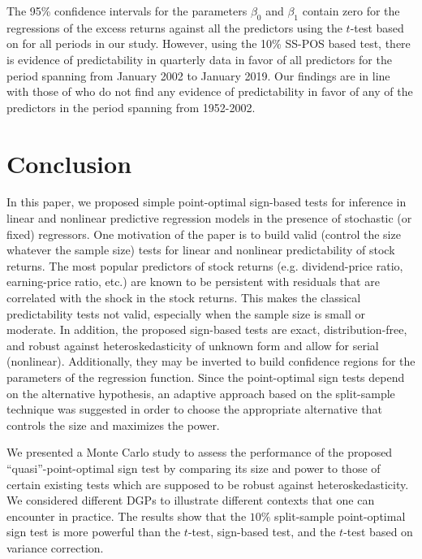 \documentclass[harvard,11pt]{article}
\begin{document}
The 95\% confidence intervals for the parameters $\beta_0$ and $\beta_1$ contain zero for the regressions of the excess returns against all the predictors using the $t$-test based on \citet{white1980heteroskedasticity} for all periods in our study. However, using the 10\% SS-POS based test, there is evidence of predictability in quarterly data in favor of all predictors for the period spanning from January 2002 to January 2019. Our findings are in line with those of \citet{campbell2006efficient} who do not find any evidence of predictability in favor of any of the predictors in the period spanning from 1952-2002. 



\section{Conclusion \label{ConclusionC1}}

In this paper, we proposed simple point-optimal sign-based tests for inference in linear
and nonlinear predictive regression models in the presence of stochastic (or fixed) regressors.
One motivation of the paper is to build valid (control the size whatever the
sample size) tests for linear and nonlinear predictability of stock returns.
The most popular predictors of stock returns (e.g. dividend-price ratio,
earning-price ratio, etc.) are known to be persistent with residuals that are correlated with
the shock in the stock returns. This makes the classical predictability tests
not valid, especially when the sample size is small or moderate. In
addition, the proposed sign-based tests are exact, distribution-free, and
robust against heteroskedasticity of unknown form and allow for serial (nonlinear). Additionally, they may be inverted to build
confidence regions for the parameters of the regression function. Since the
point-optimal sign tests depend on the alternative hypothesis, an adaptive
approach based on the split-sample technique was suggested in order to choose
the appropriate alternative that controls the size and maximizes the power.

We presented a Monte Carlo study to assess the performance of the proposed
\textquotedblleft quasi\textquotedblright -point-optimal sign test by
comparing its size and power to those of certain existing tests which are
supposed to be robust against heteroskedasticity. We considered different
DGPs to illustrate different contexts that one can encounter in practice.
The results show that the $10\%$ split-sample point-optimal sign test is
more powerful than the $t$-test, \citet{dufour1995exact} sign-based test,
and the $t$-test based on \citet{white1980heteroskedasticity} variance correction.
\end{document}
